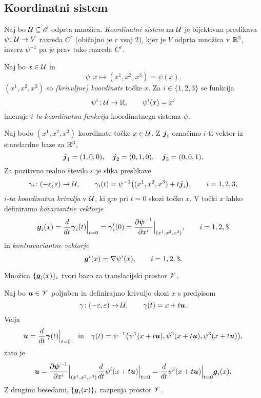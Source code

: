 \subsection{Koordinatni sistem}


\begin{definicija}
	Naj bo $\mathcal U\subseteq\mathscr E$ odprta množica. \emph{Koordinatni sistem} na $\mathcal U$ je bijektivna
	preslikava $\psi\colon \mathcal U\to V$ razreda $C^r$ (običajno je $r$ vsaj 2), kjer je $V$ odprta
	množica v $\mathbb R^3$, inverz $\psi^{-1}$ pa je prav tako razreda $C^r$.
\end{definicija}

Naj bo $x\in \mathcal U$ in
\[ \psi\colon x\mapsto (x^1,x^2,x^3)=\psi(x). \]
$(x^1,x^2,x^3)$ so \emph{(krivuljne) koordinate} točke $x$.
Za $i\in\{1,2,3\}$ se funkcija
\[ \psi^i\colon \mathcal U\to\mathbb R,\qquad \psi^i(x)=x^i \]
imenuje \emph{$i$-ta koordinatna funkcija} koordinatnega sistema $\psi$.

Naj bodo $(x^1,x^2,x^3)$ koordinate točke $x\in \mathcal U$. Z $\boldsymbol j_i$ označimo
$i$-ti vektor iz standardne baze za $\mathbb R^3$,
\[ \boldsymbol j_1=(1,0,0),\quad\boldsymbol j_2=(0,1,0),\quad\boldsymbol j_3=(0,0,1). \]
Za pozitivno realno število $\varepsilon$ je slika preslikave
\begin{equation} \label{e:kokri}
	\gamma_i\colon(-\varepsilon,\varepsilon)\to \mathcal U,\qquad
	\gamma_i(t)=\psi^{-1}\big((x^1,x^2,x^3)+t\boldsymbol j_i\big),\qquad i=1,2,3,
\end{equation}
\emph{$i$-ta koordinatna krivulja} v $\mathcal U$, ki gre pri $t=0$ skozi točko $x$.
V točki $x$ lahko definiramo \emph{kovariantne vektorje}
\begin{equation} \label{e:tanvek}
	\boldsymbol g_i(x)=\frac{d}{dt}\boldsymbol \gamma_i(t)\Big|_{t=0}=\boldsymbol \gamma_i'(0)
	=\frac{\partial\boldsymbol \psi^{-1}}{\partial x^i}\Big|_{(x^1,x^2,x^3)}
	, \qquad i=1,2,3
\end{equation}
in \emph{kontravariantne vektorje}
\begin{equation} \label{e:gradvek}
	\boldsymbol g^i(x)=\nabla\psi^i(x),\qquad i=1,2,3.
\end{equation}

\begin{trditev}
	Množica $\{\boldsymbol g_i(x)\}_i$ tvori bazo za translacijski prostor $\mathscr V$.
\end{trditev}

\proof
	Naj bo $\boldsymbol u\in\mathscr V$ poljuben in definirajmo krivuljo skozi $x$ s predpisom
	\[ \gamma\colon(-\varepsilon,\varepsilon)\to \mathcal U,\qquad \gamma(t)=x+t\boldsymbol u. \]
	Velja
	\[
		\boldsymbol u=\frac{d}{dt}\boldsymbol \gamma(t)\Big|_{t=0}\quad\textrm{in}\quad
		\gamma(t)=\psi^{-1}\big(\psi^1(x+t\boldsymbol u),\psi^2(x+t\boldsymbol u),\psi^3(x+t\boldsymbol u)\big),
	\]
	zato je
	\[
		\boldsymbol u=
		\frac{\partial\boldsymbol \psi^{-1}}{\partial x^i}\Big|_{(x^1,x^2,x^3)}
		\frac{d}{dt}\psi^i(x+t\boldsymbol u)\Big|_{t=0}=
		\frac{d}{dt}\psi^i(x+t\boldsymbol u)\Big|_{t=0}\boldsymbol g_i(x).
	\]
	Z drugimi besedami, $\{\boldsymbol g_i(x)\}_{i}$ razpenja prostor $\mathscr V$.
\endproof

